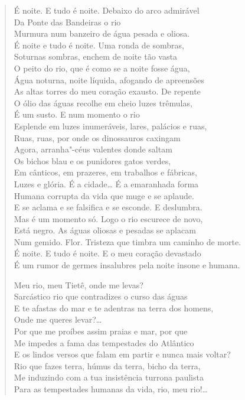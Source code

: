 {\begin{verse}
É noite. E tudo é noite. Debaixo do arco admirável\\
Da Ponte das Bandeiras o rio\\
Murmura num banzeiro de água pesada e oliosa.\\
É noite e tudo é noite. Uma ronda de sombras,\\
Soturnas sombras, enchem de noite tão vasta\\
O peito do rio, que é como se a noite fosse água,\\
Água noturna, noite líquida, afogando de apreensões\\
As altas torres do meu coração exausto. De repente\\
O ólio das águas recolhe em cheio luzes trêmulas,\\
É um susto. E num momento o rio\\
Esplende em luzes inumeráveis, lares, palácios e ruas,\\
Ruas, ruas, por onde os dinossauros caxingam\\
Agora, arranha"-céus valentes donde saltam\\
Os bichos blau e os punidores gatos verdes,\\
Em cânticos, em prazeres, em trabalhos e fábricas,\\
Luzes e glória. É a cidade\ldots{} É a emaranhada forma\\
Humana corrupta da vida que muge e se aplaude.\\
E se aclama e se falsifica e se esconde. E deslumbra.\\
Mas é um momento só. Logo o rio escurece de novo,\\
Está negro. As águas oliosas e pesadas se aplacam\\
Num gemido. Flor. Tristeza que timbra um caminho de morte.\\
É noite. E tudo é noite. E o meu coração devastado\\
É um rumor de germes insalubres pela noite insone e humana.

Meu rio, meu Tietê, onde me levas?\\
Sarcástico rio que contradizes o curso das águas\\
E te afastas do mar e te adentras na terra dos homens,\\
Onde me queres levar?\ldots{}\\
Por que me proíbes assim praias e mar, por que\\
Me impedes a fama das tempestades do Atlântico\\
E os lindos versos que falam em partir e nunca mais voltar?\\
Rio que fazes terra, húmus da terra, bicho da terra,\\
Me induzindo com a tua insistência turrona paulista\\
Para as tempestades humanas da vida, rio, meu rio!\ldots{}


\end{verse}}
